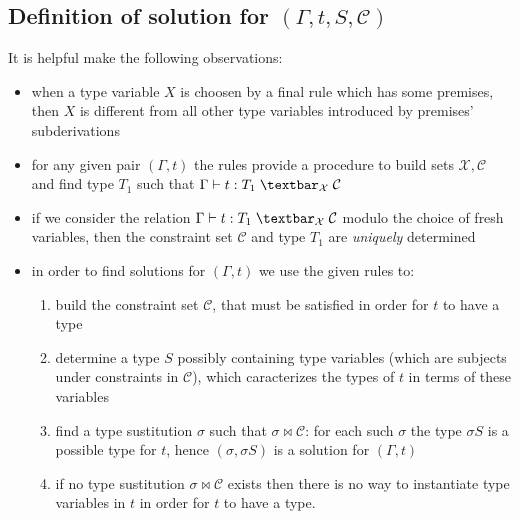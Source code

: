 \documentclass[8pt]{beamer}
\begin{document}
\subsection{Definition of solution for $(\Gamma, t, S, \mathcal{C})$}

\begin{frame}
    It is helpful make the following observations:
    \begin{itemize}
        \item when a type variable $X$ is choosen by a final rule which has
            some premises, then $X$ is different from all other type variables
            introduced by premises' subderivations
        \item for any given pair $(\Gamma, t)$ the rules provide a procedure to 
            build sets $\mathcal{X}, \mathcal{C}$ and find type $T_1$ such that
            $\Gamma \vdash t : T_1 \; \textbar_\mathcal{X} \; \mathcal{C}$
        \item if we consider the relation  
            $\Gamma \vdash t : T_1 \; \textbar_\mathcal{X} \; \mathcal{C}$ modulo
            the choice of fresh variables, then the constraint set $\mathcal{C}$ and
            type $T_1$ are \emph{uniquely} determined
        \item in order to find solutions for $(\Gamma, t)$ we use the given rules to:
            \begin{enumerate}
                \item build the constraint set $\mathcal{C}$, that
                    must be satisfied in order for $t$ to have a type
                \item determine a type $S$ possibly containing type variables (which are 
                    subjects under constraints in $\mathcal{C}$), which caracterizes
                    the types of $t$ in terms of these variables
                \item find a type sustitution $\sigma$ such that $\sigma \Join 
                    \mathcal{C}$: for each such $\sigma$ the type $\sigma S$ is
                    a possible type for $t$, hence $(\sigma, \sigma S)$ 
                    is a solution for $(\Gamma, t)$
                \item if no type sustitution $\sigma \Join \mathcal{C}$ exists then
                    there is no way to instantiate type variables in $t$ in order
                    for $t$ to have a type.
            \end{enumerate}
    \end{itemize}
\end{frame}
\end{document}
